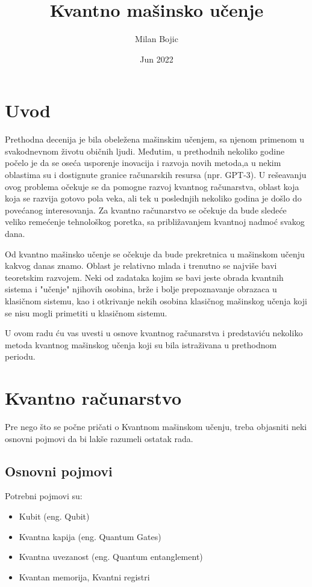 \documentclass[12pt, letterpaper, oneside]{article}
\title{Kvantno mašinsko učenje}
\author{Milan Bojic}
\date{Jun 2022}
\begin{document}
\maketitle
\newpage

\tableofcontents
\newpage
\section{Uvod}
Prethodna decenija je bila obeležena mašinskim učenjem, sa njenom primenom u svakodnevnom životu običnih ljudi.
Međutim, u prethodnih nekoliko godine počelo je da se oseća usporenje inovacija i razvoja novih metoda,a u nekim oblastima su i dostignute granice računarskih resursa (npr. GPT-3).
U rešeavanju ovog problema očekuje se da pomogne razvoj kvantnog računarstva, oblast koja koja se razvija gotovo pola veka, ali tek u poslednjih nekoliko godina je došlo do
povećanog interesovanja. Za kvantno računarstvo se očekuje da bude sledeće veliko remećenje tehnološkog poretka, sa približavanjem kvantnoj nadmoć svakog dana.

Od kvantno mašinsko učenje se očekuje da bude prekretnica u mašinskom učenju kakvog danas znamo. Oblast je relativno mlada i trenutno se najviše bavi teoretskim razvojem.
Neki od zadataka kojim se bavi jeste obrada kvantnih sistema i "učenje" njihovih osobina, brže i bolje prepoznavanje obrazaca u klasičnom sistemu, kao i
otkrivanje nekih osobina klasičnog mašinskog učenja koji se nisu mogli primetiti u klasičnom sistemu.

U ovom radu ću vas uvesti u osnove kvantnog računarstva i predstaviću nekoliko metoda kvantnog mašinskog učenja koji su bila istraživana u prethodnom periodu. 
\section{Kvantno računarstvo}
Pre nego što se počne pričati o Kvantnom mašinskom učenju, treba objasniti neki osnovni pojmovi da bi lakše razumeli ostatak rada.

\subsection{Osnovni pojmovi}
Potrebni pojmovi su:
\begin{itemize}
    \item Kubit (eng. Qubit)
    \item Kvantna kapija (eng. Quantum Gates)
    \item Kvantna uvezanost (eng. Quantum entanglement)
    \item Kvantan memorija, Kvantni registri
\end{itemize}
\end{document}
